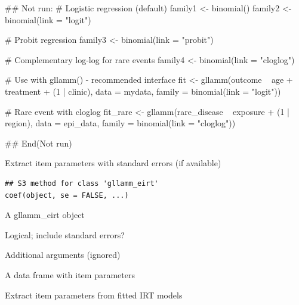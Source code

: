 \documentclass[a4paper]{book}
\begin{document}
\begin{Examples}
\begin{ExampleCode}
## Not run: 
# Logistic regression (default)
family1 <- binomial()
family2 <- binomial(link = "logit")

# Probit regression
family3 <- binomial(link = "probit")

# Complementary log-log for rare events
family4 <- binomial(link = "cloglog")

# Use with gllamm() - recommended interface
fit <- gllamm(outcome ~ age + treatment + (1 | clinic),
              data = mydata,
              family = binomial(link = "logit"))

# Rare event with cloglog
fit_rare <- gllamm(rare_disease ~ exposure + (1 | region),
                   data = epi_data,
                   family = binomial(link = "cloglog"))

## End(Not run)

\end{ExampleCode}
\end{Examples}
%
\begin{Description}
Extract item parameters with standard errors (if available)
\end{Description}
%
\begin{Usage}
\begin{verbatim}
## S3 method for class 'gllamm_eirt'
coef(object, se = FALSE, ...)
\end{verbatim}
\end{Usage}
%
\begin{Arguments}
\begin{ldescription}
\item[\code{object}] A gllamm\_eirt object

\item[\code{se}] Logical; include standard errors?

\item[\code{...}] Additional arguments (ignored)
\end{ldescription}
\end{Arguments}
%
\begin{Value}
A data frame with item parameters
\end{Value}
%
\begin{Description}
Extract item parameters from fitted IRT models
\end{Description}
\end{document}
